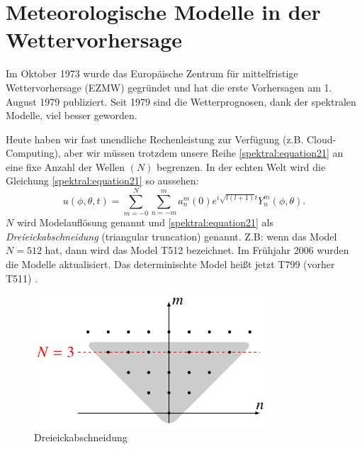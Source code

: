 %
%
%
%
\section{Meteorologische Modelle in der Wettervorhersage
\label{spektral:section:modelle}}

Im Oktober 1973 wurde das Europäische Zentrum für mittelfristige Wettervorhersage (EZMW) gegründet \cite{spektral:ezmw} und hat die erste Vorhersagen am 1. August 1979 publiziert.
Seit 1979 sind die Wetterprognosen, dank der spektralen Modelle, viel besser geworden.

Heute haben wir fast unendliche Rechenleistung zur Verfügung (z.B. Cloud-Computing), aber wir müssen trotzdem unsere Reihe \eqref{spektral:equation21} an eine fixe Anzahl der Wellen $(N)$ begrenzen.
In der echten Welt wird die Gleichung \eqref{spektral:equation21} so aussehen:
\begin{equation}
u(\phi, \theta, t) = \sum_{m=-0}^{N}\sum_{n=-m}^{m}a_n^m(0)e^{i\sqrt{l(l+1)}t}Y_n^m(\phi, \theta).
\label{spektral:equation22}
\end{equation}
$N$ wird Modelauflösung genannt \cite[Seite 223]{spektral:NumericalWeatherPrediction} und \eqref{spektral:equation21} als \textit{Dreieickabschneidung} (triangular truncation) genannt.
Z.B: wenn das Model $N = 512$ hat, dann wird das Model T512 bezeichnet. 
Im Frühjahr 2006 wurden die Modelle aktualisiert. Das determinischte Model heißt jetzt T799 (vorher T511) \cite[Seite 222]{spektral:NumericalWeatherPrediction}.
\begin{figure}[h]
	\centering
	\includegraphics[height=140pt]{papers/spektral/images/triangle_truncation.pdf}
	\caption{Dreieickabschneidung}
    \label{spektral:fig:triangletrunc}
\end{figure}

